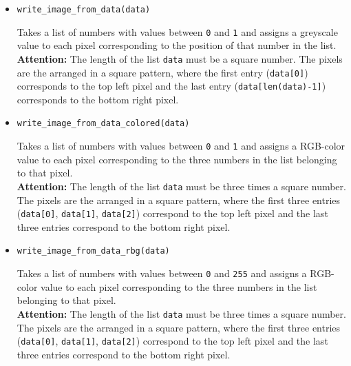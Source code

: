 \documentclass[11pt,a4paper]{report}
\begin{document}
\begin{itemize}
\item \begin{lstlisting}
write_image_from_data(data)
\end{lstlisting}

Takes a list of numbers with values between \texttt{0} and \texttt{1} and assigns a greyscale value to each pixel corresponding to the position of that number  in  the list. \\
{\bf Attention:} The length of the list \texttt{data} must be a square number. The pixels are the arranged in a square pattern, where the first entry (\texttt{data[0]}) corresponds to  the top left pixel and the last entry (\texttt{data[len(data)-1]}) corresponds to the bottom right pixel.

\item \begin{lstlisting}
write_image_from_data_colored(data)
\end{lstlisting}

Takes a list of numbers with values between \texttt{0} and \texttt{1} and assigns a \gls{RGB-color} value to each pixel corresponding to the three numbers in  the list  belonging to that pixel. \\
{\bf Attention:} The length of the list \texttt{data} must be three times a square number. The pixels are the arranged in a square pattern, where the first three entries (\texttt{data[0]}, \texttt{data[1]}, \texttt{data[2]}) correspond to the top left pixel and the last three entries  correspond to the bottom right pixel.



\item \begin{lstlisting}
write_image_from_data_rbg(data)
\end{lstlisting}

Takes a list of numbers with values between \texttt{0} and \texttt{255} and assigns a \gls{RGB-color} value to each pixel corresponding to the three numbers in  the list  belonging to that pixel. \\
{\bf Attention:} The length of the list \texttt{data} must be three times a square number. The pixels are the arranged in a square pattern, where the first three entries (\texttt{data[0]}, \texttt{data[1]}, \texttt{data[2]}) correspond to the top left pixel and the last three entries  correspond to the bottom right pixel.




\end{itemize}

\printglossary
\end{document}
